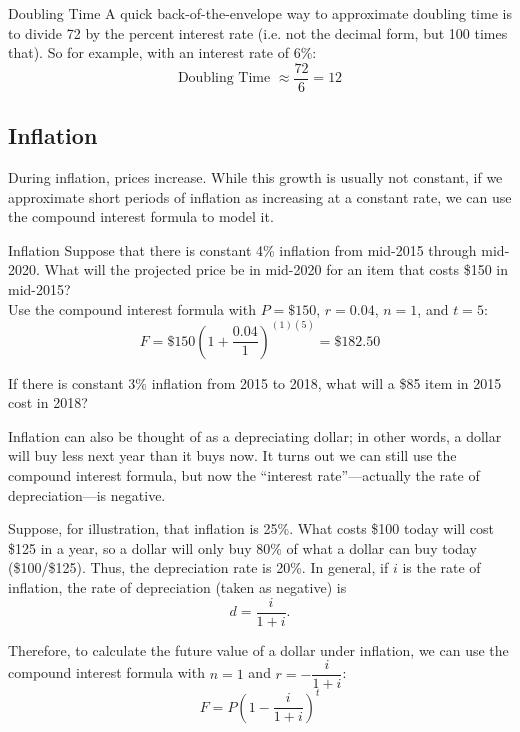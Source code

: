 \begin{proc}{Doubling Time}
A quick back-of-the-envelope way to approximate doubling time is to divide 72 by the percent interest rate (i.e. not the decimal form, but 100 times that).  So for example, with an interest rate of 6\%:
\[\textrm{Doubling Time } \approx \dfrac{72}{6} = 12\]
\end{proc}
\pagebreak

\subsection{Inflation}
During inflation, prices increase.  While this growth is usually not constant, if we approximate short periods of inflation as increasing at a constant rate, we can use the compound interest formula to model it.

\begin{example}[https://www.youtube.com/watch?v=gNp9Dlq-ksk]{Inflation}
Suppose that there is constant 4\% inflation from mid-2015 through mid-2020.  What will the projected price be in mid-2020 for an item that costs \$150 in mid-2015?\\

Use the compound interest formula with $P=\$150$, $r=0.04$, $n=1$, and $t=5$:
\[F=\$150\left(1+\dfrac{0.04}{1}\right)^{(1)(5)} = \$182.50\]
\end{example}

\begin{try}
If there is constant 3\% inflation from 2015 to 2018, what will a \$85 item in 2015 cost in 2018?
\end{try}

Inflation can also be thought of as a depreciating dollar; in other words, a dollar will buy less next year than it buys now.  It turns out we can still use the compound interest formula, but now the ``interest rate''---actually the rate of depreciation---is negative.

Suppose, for illustration, that inflation is 25\%.  What costs \$100 today will cost \$125 in a year, so a dollar will only buy 80\% of what a dollar can buy today (\$100/\$125).  Thus, the depreciation rate is 20\%.  In general, if $i$ is the rate of inflation, the rate of depreciation (taken as negative) is
\[d=\dfrac{i}{1+i}.\]

Therefore, to calculate the future value of a dollar under inflation, we can use the compound interest formula with $n=1$ and $r=-\dfrac{i}{1+i}$:
\[F=P\left(1-\dfrac{i}{1+i}\right)^t\]

